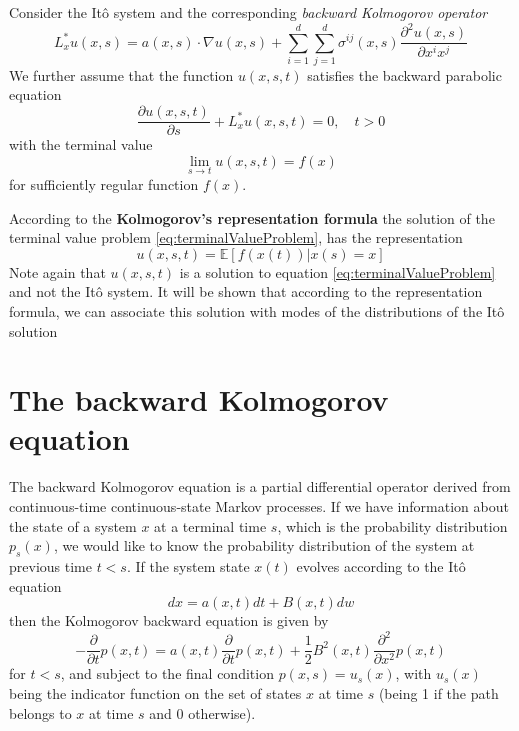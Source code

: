 \documentclass[12pt]{book}
\begin{document}
Consider the It\^o system and the corresponding \textit{backward Kolmogorov operator}
\begin{equation}\label{eq:backwardKolmogorovOperator}
	L^*_xu(x,s)=a(x,s)\cdot \nabla u(x,s)+\sum_{i=1}^d\sum_{j=1}^d \sigma^{ij}(x,s)\frac{\partial^2u(x,s)}{\partial x^ix^j}
\end{equation} 
We further assume that the function $u(x,s,t)$ satisfies the backward parabolic equation 
\begin{equation}\label{eq:terminalValueProblem}
	\frac{\partial u(x,s,t)}{\partial s}+L^*_x u(x,s,t)=0,\quad t>0
\end{equation}
with the terminal value 
\begin{equation*}
	\lim_{s\rightarrow t} u(x,s,t)=f(x)
\end{equation*}
for sufficiently regular function $f(x)$. 

According to the \textbf{Kolmogorov's representation formula} the solution of the terminal value problem \ref{eq:terminalValueProblem}, has the representation 
\begin{equation*}
	u(x,s,t)=\mathbb{E}[f(x(t))|x(s)=x]
\end{equation*}
Note again that $u(x,s,t)$ is a solution to equation \ref{eq:terminalValueProblem} and not the It\^{o} system. It will be shown that according to the representation formula, we can associate this solution with modes of the distributions of the It\^{o} solution 


\section{The backward Kolmogorov equation}\label{section:backwardKolmogorovEquation}
The backward Kolmogorov equation is a partial differential operator derived from continuous-time continuous-state Markov processes. If we have information about the state of a system $x$ at a terminal time $s$, which is the probability distribution $p_s(x)$, we would like to know the probability distribution of the system at previous time $t<s$.
If the system state $x(t)$ evolves according to the It\^o equation 
\begin{equation*}
dx=a(x,t)dt+B(x,t)dw
\end{equation*}
then the Kolmogorov backward equation is given by 
\begin{equation}\label{eq:kolmogorovBackwardEquation}
-\frac{\partial}{\partial t}p(x,t) = a(x,t)\frac{\partial}{\partial t}p(x,t)+\frac{1}{2}B^2(x,t)\frac{\partial^2}{\partial x^2}p(x,t)
\end{equation}
for $t<s$, and subject to the final condition $p(x,s)=u_s(x)$, with $u_s(x)$ being the indicator function on the set of states $x$ at time $s$ (being 1 if the path belongs to $x$ at time $s$ and 0 otherwise).
\end{document}
